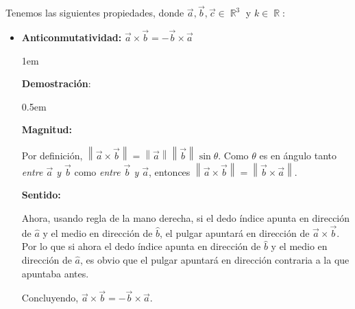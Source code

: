 \documentclass[12pt, fleqn]{report}                             %
\newenvironment{SmallIndentation}[1][0.75em]                    %
        {\begin{adjustwidth}{#1}{}\begin{footnotesize}}             %
        {\end{footnotesize}\end{adjustwidth}}                       %
\theoremstyle{break}                                            %
\DeclareMathOperator \Reals        {\mathbb{R}}                 %
\newcommand{\Abs}[1]{\left\lVert #1 \right\lVert}               %
\begin{document}
                Tenemos las siguientes propiedades, donde $\vec{a}, \vec{b}, \vec{c} \in \Reals^3$ y $k \in \Reals$:
                \begin{itemize}

                    \item
                        \textbf{Anticonmutatividad:}
                            $\vec{a} \times \vec{b} = -\vec{b} \times \vec{a}$

                            \begin{SmallIndentation}[1em]
                                \textbf{Demostración}:

                                \begin{SmallIndentation}[0.5em]
                                    
                                    \textbf{Magnitud:}

                                    Por definición, $\Abs{\vec{a} \times \vec{b}} = \Abs{\vec{a}} \Abs{\vec{b}} \sin \theta$.
                                    Como $\theta$ es en ángulo tanto \emph{entre $\vec{a}$ y $\vec{b}$} como 
                                    \emph{entre $\vec{b}$ y $\vec{a}$}, entonces 
                                    $\Abs{\vec{a} \times \vec{b}} = \Abs{\vec{b} \times \vec{a}}$.
                            
                                    \textbf{Sentido:}

                                    Ahora, usando regla de la mano derecha, si el dedo índice apunta en dirección
                                    de $\hat{a}$ y el medio en dirección de $\hat{b}$, el pulgar apuntará en dirección
                                    de $\vec{a} \times \vec{b}$.
                                    Por lo que si ahora el dedo índice apunta en dirección de $\hat{b}$ y el medio en
                                    dirección de $\hat{a}$, es obvio que el pulgar apuntará en dirección contraria a la
                                    que apuntaba antes.
                                
                                \end{SmallIndentation}
                        
                                Concluyendo, $\vec{a} \times \vec{b} = -\vec{b} \times \vec{a}$.
                            
                            \end{SmallIndentation}
                                

\end{itemize}
\end{document}

